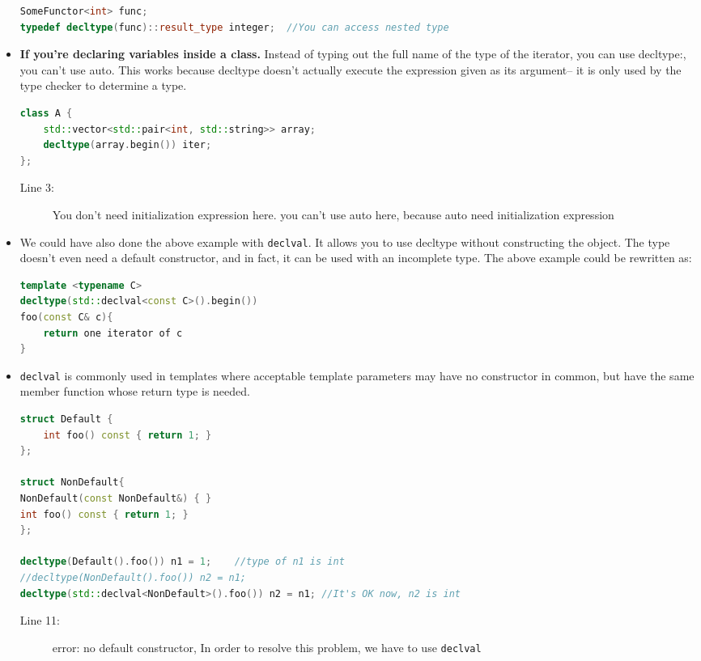 \documentclass[a4paper,11pt,twoside]{book}
\begin{document}
\begin{itemize}
\begin{lstlisting}[frame=single, language=c++, mathescape=true]
SomeFunctor<int> func;
typedef decltype(func)::result_type integer;  //You can access nested type
\end{lstlisting}
	
	\item  \textbf{If you're declaring variables inside a class.} Instead of typing out the full name of the type of the iterator, you can use decltype:, you can't use auto.  This works because decltype doesn't actually execute the expression given as its argument-- it is only used by the type checker to determine a type.
\begin{lstlisting}[frame=single, language=c++, mathescape=true]
class A {
	std::vector<std::pair<int, std::string>> array;
	decltype(array.begin()) iter; 
};
\end{lstlisting}
\begin{description}
	\item[Line 3:] You don't need initialization expression here. you can't use auto here, because auto need initialization expression
\end{description}
	
	\item We could have also done the above example with \texttt{declval}. It allows you to use decltype without constructing the object. The type doesn't even need a default constructor, and in fact, it can be used with an incomplete type. The above example could be rewritten as:
	
\begin{lstlisting}[frame=single, language=c++, mathescape=true]
template <typename C>
decltype(std::declval<const C>().begin())
foo(const C& c){
	return one iterator of c
}
\end{lstlisting}
	
	\item \texttt{declval} is commonly used in templates where acceptable template parameters may have no constructor in common, but have the same member function whose return type is needed.
	
\begin{lstlisting}[frame=single, language=c++]
struct Default {
	int foo() const { return 1; } 
};

struct NonDefault{
NonDefault(const NonDefault&) { }
int foo() const { return 1; }
};
	
decltype(Default().foo()) n1 = 1;    //type of n1 is int
//decltype(NonDefault().foo()) n2 = n1;  
decltype(std::declval<NonDefault>().foo()) n2 = n1; //It's OK now, n2 is int
\end{lstlisting}
\begin{description}
	\item[Line 11:]  error: no default constructor, In order to resolve this problem, we have to use \texttt{declval}
\end{description}
	

\end{itemize}
\end{document}
